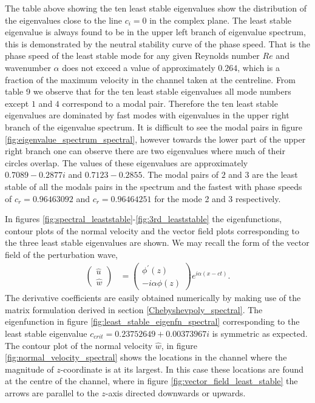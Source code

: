 \documentclass[a4paper, 12pt, twoside, openright]{article}
\numberwithin{equation}{section}
\begin{document}
The table above showing the ten least stable eigenvalues show the distribution of the eigenvalues close to the line $c_i=0$ in the complex plane. The least stable eigenvalue is always found to be in the upper left branch of eigenvalue spectrum, this is demonstrated by the neutral stability curve of the phase speed. That is the phase speed of the least stable mode for any given Reynolds number $Re$ and wavenumber $\alpha$ does not exceed a value of approximately $0.264$, which is a fraction of the maximum velocity in the channel taken at the centreline. From table 9 we observe that for the ten least stable eigenvalues all mode numbers except $1$ and $4$ correspond to a modal pair. Therefore the ten least stable eigenvalues are dominated by fast modes with eigenvalues in the upper right branch of the eigenvalue spectrum. It is difficult to see the modal pairs in figure \ref{fig:eigenvalue_spectrum_spectral}, however towards the lower part of the upper right branch one can observe there are two eigenvalues where much of their circles overlap. The values of these eigenvalues are approximately $0.7089-0.2877i$ and $0.7123-0.2855$. The modal pairs of $2$ and $3$ are the least stable of all the modals pairs in the spectrum and the fastest with phase speeds of $c_r=0.96463092$ and $c_r=0.96464251$ for the mode 2 and 3 respectively. %

In figures \ref{fig:spectral_leaststable}-\ref{fig:3rd_leaststable} the eigenfunctions, contour plots of the normal velocity and the vector field plots corresponding to the three least stable eigenvalues are shown. We may recall the form of the vector field of the perturbation wave,
\begin{align}
\begin{pmatrix}
\hat u \\ \hat w 
\end{pmatrix}
&= 
\begin{pmatrix}
\phi^{\prime}(z) \\ -i\alpha\phi(z)  
\end{pmatrix}
e^{i\alpha(x-ct)}.\label{eq:vector_field}
\end{align}       
The derivative coefficients are easily obtained numerically by making use of the matrix formulation derived in section \ref{Chebyshevpoly_spectral}. The eigenfunction in figure \ref{fig:least_stable_eigenfn_spectral} corresponding to the least stable eigenvalue $c_{crit}=  0.23752649 + 0.00373967i$ is symmetric as expected. The contour plot of the normal velocity $\hat w$, in figure \ref{fig:normal_velocity_spectral} shows the locations in the channel where the magnitude of $z$-coordinate is at its largest. In this case these locations are found at the centre of the channel, where in figure \ref{fig:vector_field_least_stable} the arrows are parallel to the $z$-axis directed downwards or upwards.
\end{document}
